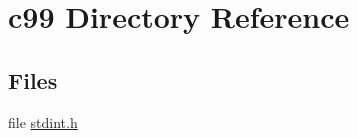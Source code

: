 \section{c99 Directory Reference}
\label{dir_459143f1e15ecbef68a46e16acf20e36}
\subsection*{Files}
\begin{DoxyCompactItemize}
\item 
file \hyperlink{stdint_8h}{stdint.\-h}
\end{DoxyCompactItemize}
